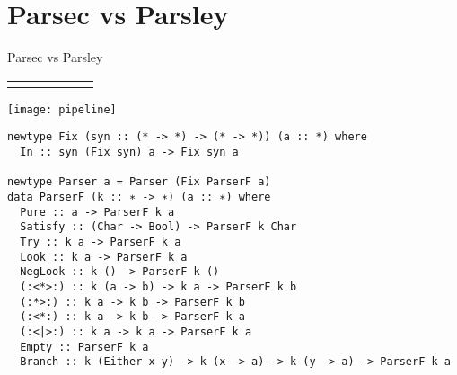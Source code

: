 \documentclass[aspectratio=169
  , xcolor={svgnames}
  , hyperref={ colorlinks,citecolor=Blue
             , linkcolor=DarkRed,urlcolor=DarkBlue}
  , russian
  ]{beamer}
\begin{document}


\section{Parsec vs Parsley} 

\begin{frame}{Parsec vs Parsley} 
\begin{tabular}{|c|c|c|c|c|c|}
\hline
 &  &  &  &  &  \\
\hline
 &  &  &  &  &  \\
\hline
\end{tabular} 
\end{frame}

    
\begin{frame}[fragile]{}
\texttt{[image: pipeline]}

\begin{verbatim}
newtype Fix (syn :: (* -> *) -> (* -> *)) (a :: *) where 
  In :: syn (Fix syn) a -> Fix syn a

newtype Parser a = Parser (Fix ParserF a)
data ParserF (k :: ∗ -> ∗) (a :: ∗) where
  Pure :: a -> ParserF k a
  Satisfy :: (Char -> Bool) -> ParserF k Char
  Try :: k a -> ParserF k a
  Look :: k a -> ParserF k a
  NegLook :: k () -> ParserF k ()
  (:<*>:) :: k (a -> b) -> k a -> ParserF k b
  (:*>:) :: k a -> k b -> ParserF k b
  (:<*:) :: k a -> k b -> ParserF k a
  (:<|>:) :: k a -> k a -> ParserF k a
  Empty :: ParserF k a
  Branch :: k (Either x y) -> k (x -> a) -> k (y -> a) -> ParserF k a
\end{verbatim}
\end{frame}
\end{document}
